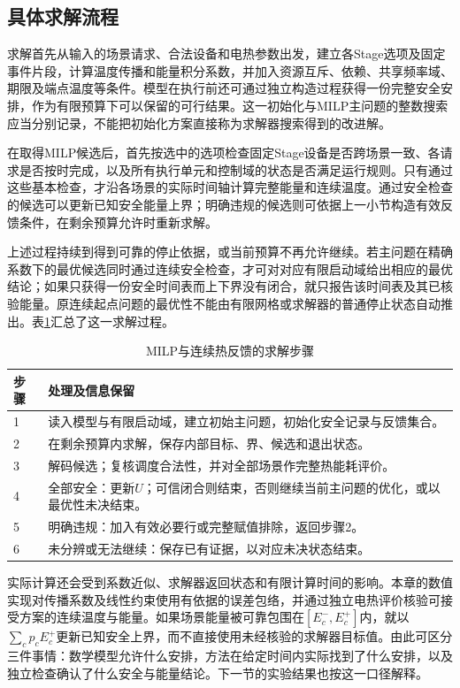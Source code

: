 \subsection{具体求解流程}

求解首先从输入的场景请求、合法设备和电热参数出发，建立各Stage选项及固定事件片段，计算温度传播和能量积分系数，并加入资源互斥、依赖、共享频率域、期限及端点温度等条件。模型在执行前还可通过独立构造过程获得一份完整安全安排，作为有限预算下可以保留的可行结果。这一初始化与MILP主问题的整数搜索应当分别记录，不能把初始化方案直接称为求解器搜索得到的改进解。

在取得MILP候选后，首先按选中的选项检查固定Stage设备是否跨场景一致、各请求是否按时完成，以及所有执行单元和控制域的状态是否满足运行规则。只有通过这些基本检查，才沿各场景的实际时间轴计算完整能量和连续温度。通过安全检查的候选可以更新已知安全能量上界；明确违规的候选则可依据上一小节构造有效反馈条件，在剩余预算允许时重新求解。

上述过程持续到得到可靠的停止依据，或当前预算不再允许继续。若主问题在精确系数下的最优候选同时通过连续安全检查，才可对对应有限启动域给出相应的最优结论；如果只获得一份安全时间表而上下界没有闭合，就只报告该时间表及其已核验能量。原连续起点问题的最优性不能由有限网格或求解器的普通停止状态自动推出。表\ref{tab:solver-outline}汇总了这一求解过程。
\begin{table}[htbp]
\centering
\caption{MILP与连续热反馈的求解步骤}
\label{tab:solver-outline}
\begin{tabular}{p{}p{}}
\toprule
步骤 & 处理及信息保留 \\
\midrule
1 & 读入模型与有限启动域，建立初始主问题，初始化安全记录与反馈集合。\\
2 & 在剩余预算内求解，保存内部目标、界、候选和退出状态。\\
3 & 解码候选；复核调度合法性，并对全部场景作完整热能耗评价。\\
4 & 全部安全：更新\(U\)；可信闭合则结束，否则继续当前主问题的优化，或以最优性未决结束。\\
5 & 明确违规：加入有效必要行或完整赋值排除，返回步骤2。\\
6 & 未分辨或无法继续：保存已有证据，以对应未决状态结束。\\
\bottomrule
\end{tabular}
\end{table}

实际计算还会受到系数近似、求解器返回状态和有限计算时间的影响。本章的数值实现对传播系数及线性约束使用有依据的误差包络，并通过独立电热评价核验可接受方案的连续温度与能量。如果场景能量被可靠包围在$[E_c^-,E_c^+]$内，就以$\sum_cp_cE_c^+$更新已知安全上界，而不直接使用未经核验的求解器目标值。由此可区分三件事情：数学模型允许什么安排，方法在给定时间内实际找到了什么安排，以及独立检查确认了什么安全与能量结论。下一节的实验结果也按这一口径解释。



